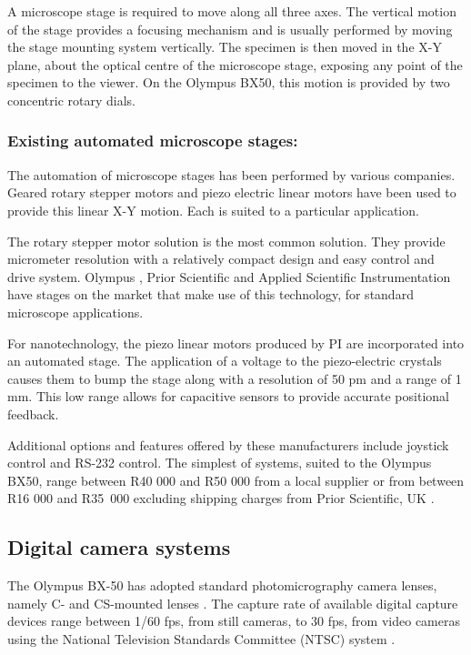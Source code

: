 \documentclass[10pt,twocolumn]{witseiepaper}
\begin{document}
A microscope stage is required to move along all three axes.  The vertical
motion of the stage provides a focusing mechanism and is usually performed by
moving the stage mounting system vertically.  The specimen is then moved in
the X-Y plane, about the optical centre of the microscope stage, exposing any
point of the specimen to the viewer.  On the Olympus BX50, this motion is
provided by two concentric rotary dials.

\subsubsection*{Existing automated microscope stages:}

The automation of microscope stages has been performed by various companies.
Geared rotary stepper motors and piezo electric linear motors have been used
to provide this linear X-Y motion.  Each is suited to a particular
application.

The rotary stepper motor solution is the most common solution.  They provide
micrometer resolution with a relatively compact design and easy control and
drive system.  Olympus \cite{Olympus}, Prior Scientific \cite{Prior} and Applied
Scientific Instrumentation \cite{Ms4} have stages on the market that make use
of this technology, for standard microscope applications.

For nanotechnology, the piezo linear motors produced by PI \cite{PI} are
incorporated into an automated stage.  The application of a voltage to the
piezo-electric crystals causes them to bump the stage along with a resolution
of 50 pm and a range of 1 mm.  This low range allows for capacitive sensors to
provide accurate positional feedback.

Additional options and features offered by these manufacturers include
joystick control and RS-232 control.  The simplest of systems, suited to the
Olympus BX50, range between R40 000 and R50 000 from a local
supplier \cite{Elmulab} or from between R16 000 and \mbox{R35 000} excluding
shipping charges from Prior Scientific, UK \cite{Prior}. 

\subsection{Digital camera systems}

The Olympus BX-50 has adopted standard photomicrography camera lenses, namely
C- and CS-mounted lenses \cite{Olympus}.  The capture rate of available
digital capture devices range between 1/60 fps, from still cameras, to 30 fps,
from video cameras using the National Television Standards Committee (NTSC)
system \cite{Olympus}.
\end{document}
